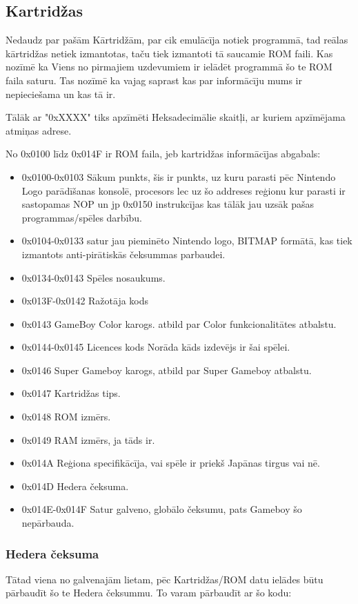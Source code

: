 \documentclass[12pt]{article}
\begin{document}
	\pagebreak
	\subsection{Kartridžas}
	Nedaudz par pašām Kārtridžām, par cik emulācīja notiek programmā, tad reālas kārtridžas netiek izmantotas, taču tiek izmantoti tā saucamie ROM faili. Kas nozīmē ka Viens no pirmajiem uzdevumiem ir ielādēt programmā šo te ROM faila saturu. Tas nozīmē ka vajag saprast kas par informācīju mums ir nepieciešama un kas tā ir.
	
	Tālāk ar "0xXXXX" tiks apzīmēti Heksadecimālie skaitļi, ar kuriem apzīmējama atmiņas adrese. 
	
	No 0x0100 līdz 0x014F ir ROM faila, jeb kartridžas informācījas abgabals:
	\begin{itemize}
		\item 0x0100-0x0103 Sākum punkts, šis ir punkts, uz kuru parasti pēc Nintendo Logo parādīšanas konsolē, procesors lec uz šo addreses reģionu kur parasti ir sastopamas NOP un jp 0x0150 instrukcījas kas tālāk jau uzsāk pašas programmas/spēles darbību.
		\item 0x0104-0x0133 satur jau pieminēto Nintendo logo, BITMAP formātā, kas tiek izmantots anti-pirātiskās čeksummas parbaudei.
		\item 0x0134-0x0143 Spēles nosaukums. 
		\item 0x013F-0x0142 Ražotāja kods
		\item 0x0143 GameBoy Color karogs. atbild par Color funkcionalitātes atbalstu.
		\item 0x0144-0x0145 Licences kods Norāda kāds izdevējs ir šai spēlei.
		\item 0x0146 Super Gameboy karogs, atbild par Super Gameboy atbalstu.
		\item 0x0147 Kartridžas tips.
		\item 0x0148 ROM izmērs.
		\item 0x0149 RAM izmērs, ja tāds ir.
		\item 0x014A Reģiona specifikācīja, vai spēle ir priekš Japānas tirgus vai nē.
		\item 0x014D Hedera čeksuma.
		\item 0x014E-0x014F Satur galveno, globālo čeksumu, pats Gameboy šo nepārbauda.
	\end{itemize} 
	
	\pagebreak
	\subsubsection{Hedera čeksuma}
	Tātad viena no galvenajām lietam, pēc Kartridžas/ROM datu ielādes būtu pārbaudīt šo te Hedera čeksummu. To varam  pārbaudīt ar šo kodu:
	
\end{document}
